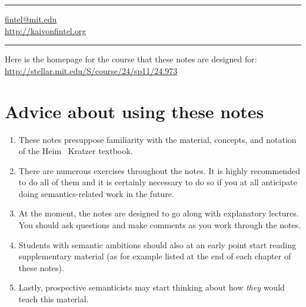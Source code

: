 \plainbreak{1}

\href{mailto:fintel@mit.edu}{fintel@mit.edu}\\
\url{http://kaivonfintel.org} 

\plainbreak{1} 

Here is the homepage for the course that these notes are designed for:\\[6pt]
\url{http://stellar.mit.edu/S/course/24/sp11/24.973}

% 

\ab 
\vfill\null

\cleardoublepage

\null
\vfill \ba 

\section*{Advice about using these notes}
\begin{enumerate}
	\item These notes presuppose familiarity with the material, concepts, and notation of the Heim \amp\ Kratzer textbook. 
	\item There are numerous exercises throughout the notes. It is highly recommended to do all of them and it is certainly necessary to do so if you at all anticipate doing semantics-related work in the future. 
	\item At the moment, the notes are designed to go along with explanatory lectures. You should ask questions and make comments as you work through the notes. 
	\item Students with semantic ambitions should also at an early point start reading supplementary material (as for example listed at the end of each chapter of these notes). 
	\item Lastly, prospective semanticists may start thinking about how \emph{they} would teach this material. 
\end{enumerate}

\ab 
\vfill\null

\newpage\hbox{}
\vfill{\scshape{}}
\vfill\hbox{}\thispagestyle{cleared}